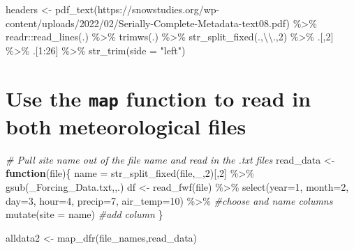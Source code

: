\documentclass[
]{book}
\newenvironment{Shaded}{\begin{snugshade}}{\end{snugshade}}
\newcommand{\AttributeTok}[1]{\textcolor[rgb]{0.77,0.63,0.00}{#1}}
\newcommand{\CommentTok}[1]{\textcolor[rgb]{0.56,0.35,0.01}{\textit{#1}}}
\newcommand{\ControlFlowTok}[1]{\textcolor[rgb]{0.13,0.29,0.53}{\textbf{#1}}}
\newcommand{\DecValTok}[1]{\textcolor[rgb]{0.00,0.00,0.81}{#1}}
\newcommand{\FunctionTok}[1]{\textcolor[rgb]{0.00,0.00,0.00}{#1}}
\newcommand{\NormalTok}[1]{#1}
\newcommand{\OtherTok}[1]{\textcolor[rgb]{0.56,0.35,0.01}{#1}}
\newcommand{\SpecialCharTok}[1]{\textcolor[rgb]{0.00,0.00,0.00}{#1}}
\newcommand{\StringTok}[1]{\textcolor[rgb]{0.31,0.60,0.02}{#1}}
\begin{document}
\begin{Shaded}
\begin{Highlighting}[]
\NormalTok{headers }\OtherTok{\textless{}{-}} \FunctionTok{pdf\_text}\NormalTok{(}\StringTok{\textquotesingle{}https://snowstudies.org/wp{-}content/uploads/2022/02/Serially{-}Complete{-}Metadata{-}text08.pdf\textquotesingle{}}\NormalTok{) }\SpecialCharTok{\%\textgreater{}\%}
\NormalTok{  readr}\SpecialCharTok{::}\FunctionTok{read\_lines}\NormalTok{(.) }\SpecialCharTok{\%\textgreater{}\%}
  \FunctionTok{trimws}\NormalTok{(.) }\SpecialCharTok{\%\textgreater{}\%}
  \FunctionTok{str\_split\_fixed}\NormalTok{(.,}\StringTok{\textquotesingle{}}\SpecialCharTok{\textbackslash{}\textbackslash{}}\StringTok{.\textquotesingle{}}\NormalTok{,}\DecValTok{2}\NormalTok{) }\SpecialCharTok{\%\textgreater{}\%}
\NormalTok{  .[,}\DecValTok{2}\NormalTok{] }\SpecialCharTok{\%\textgreater{}\%}
\NormalTok{  .[}\DecValTok{1}\SpecialCharTok{:}\DecValTok{26}\NormalTok{] }\SpecialCharTok{\%\textgreater{}\%}
  \FunctionTok{str\_trim}\NormalTok{(}\AttributeTok{side =} \StringTok{"left"}\NormalTok{)}
\end{Highlighting}
\end{Shaded}

\hypertarget{use-the-map-function-to-read-in-both-meteorological-files}{%
\section{\texorpdfstring{Use the \texttt{map} function to read in both meteorological files}{Use the map function to read in both meteorological files}}\label{use-the-map-function-to-read-in-both-meteorological-files}}

\begin{Shaded}
\begin{Highlighting}[]
\CommentTok{\# Pull site name out of the file name and read in the .txt files}
\NormalTok{read\_data }\OtherTok{\textless{}{-}} \ControlFlowTok{function}\NormalTok{(file)\{}
\NormalTok{  name }\OtherTok{=} \FunctionTok{str\_split\_fixed}\NormalTok{(file,}\StringTok{\textquotesingle{}\_\textquotesingle{}}\NormalTok{,}\DecValTok{2}\NormalTok{)[,}\DecValTok{2}\NormalTok{] }\SpecialCharTok{\%\textgreater{}\%} 
    \FunctionTok{gsub}\NormalTok{(}\StringTok{\textquotesingle{}\_Forcing\_Data.txt\textquotesingle{}}\NormalTok{,}\StringTok{\textquotesingle{}\textquotesingle{}}\NormalTok{,.) }
\NormalTok{  df }\OtherTok{\textless{}{-}} \FunctionTok{read\_fwf}\NormalTok{(file) }\SpecialCharTok{\%\textgreater{}\%} 
    \FunctionTok{select}\NormalTok{(}\AttributeTok{year=}\DecValTok{1}\NormalTok{, }\AttributeTok{month=}\DecValTok{2}\NormalTok{, }\AttributeTok{day=}\DecValTok{3}\NormalTok{, }\AttributeTok{hour=}\DecValTok{4}\NormalTok{, }\AttributeTok{precip=}\DecValTok{7}\NormalTok{, }\AttributeTok{air\_temp=}\DecValTok{10}\NormalTok{) }\SpecialCharTok{\%\textgreater{}\%} \CommentTok{\#choose and name columns}
    \FunctionTok{mutate}\NormalTok{(}\AttributeTok{site =}\NormalTok{ name) }\CommentTok{\#add column }
\NormalTok{\}}

\NormalTok{alldata2 }\OtherTok{\textless{}{-}} \FunctionTok{map\_dfr}\NormalTok{(file\_names,read\_data) }
\end{Highlighting}
\end{Shaded}
\end{document}
